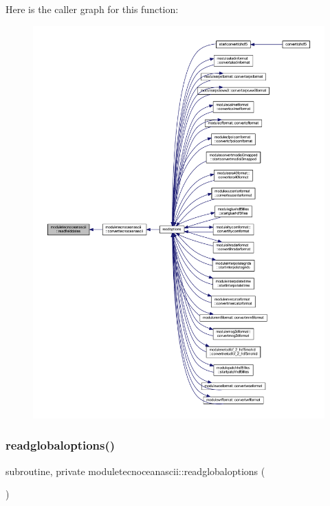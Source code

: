 Here is the caller graph for this function\+:\nopagebreak
\begin{figure}[H]
\begin{center}
\leavevmode
\includegraphics[width=350pt]{namespacemoduletecnoceanascii_a46dae8318879d56217ce0452e09fa5a5_icgraph}
\end{center}
\end{figure}
\mbox{\label{namespacemoduletecnoceanascii_a03b597bccde1ea1f6661a59bd7599167}} 
\subsubsection{\texorpdfstring{readglobaloptions()}{readglobaloptions()}}
{\footnotesize\ttfamily subroutine, private moduletecnoceanascii\+::readglobaloptions (\begin{DoxyParamCaption}{ }\end{DoxyParamCaption})\hspace{0.3cm}{\ttfamily [private]}}

